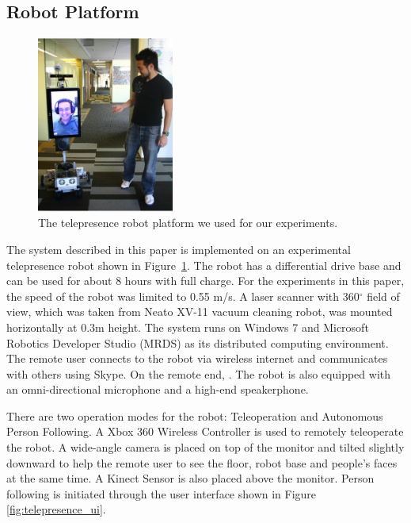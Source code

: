 \subsection{Robot Platform}

\begin{figure}[h!]
\centering
\includegraphics[width=0.4\textwidth]{pics/telepresence_robot}
\caption{The telepresence robot platform we used for our experiments.}
\label{fig:telepresence_robot}
\end{figure}

The system described in this paper is implemented on an experimental telepresence robot shown in Figure~\ref{fig:telepresence_robot}. The robot has a differential drive base and can be used for about 8 hours with full charge. For the experiments in this paper, the speed of the robot was limited to 0.55 m/s. A laser scanner with 360$^{\circ}$ field of view, which was taken from Neato XV-11 vacuum cleaning robot, was mounted horizontally at 0.3m height. The system runs on Windows 7 and Microsoft Robotics Developer Studio (MRDS) as its distributed computing environment. The remote user connects to the robot via wireless internet and communicates with others using Skype. On the remote end, . The robot is also equipped with an omni-directional microphone and a high-end speakerphone.

There are two operation modes for the robot: Teleoperation and Autonomous Person Following. A Xbox 360 Wireless Controller is used to remotely teleoperate the robot.  A wide-angle camera is placed on top of the monitor and tilted slightly downward to help the remote user to see the floor, robot base and people's faces at the same time. A Kinect Sensor is also placed above the monitor. Person following is initiated through the user interface shown in Figure \ref{fig:telepresence_ui}.

